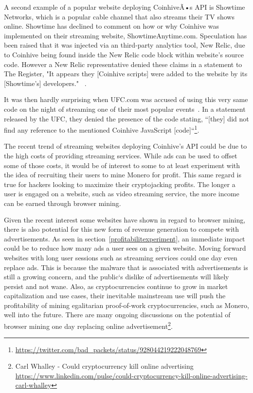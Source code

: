 A second example of a popular website deploying CoinhiveÃ•s API is Showtime Networks, which is a popular cable channel that also streams their TV shows online. Showtime has declined to comment on how or why Coinhive was implemented on their streaming website, ShowtimeAnytime.com. Speculation has been raised that it was injected via an third-party analytics tool, New Relic, due to Coinhive being found inside the New Relic code block within website's source code. However a New Relic representative denied these claims in a statement to The Register, "It appears they [Coinhive scripts] were added to the website by its [Showtime's] developers." ~\cite{registershowtime}. 

It was then hardly surprising when UFC.com was accused of using this very same code on the night of streaming one of their most popular events~\cite{registerufcmonero}. In a statement released by the UFC, they denied the presence of the code stating, ``[they] did not find any reference to the mentioned Coinhive JavaScript [code]``\footnote{\url{https://twitter.com/bad_packets/status/928044219222048769}}.
 
The recent trend of streaming websites deploying Coinhive's API could be due to the high costs of providing streaming services. While ads can be used to offset some of those costs, it would be of interest to some to at least experiment with the idea of recruiting their users to mine Monero for profit. This same regard is true for hackers looking to maximize their cryptojacking profits. The longer a user is engaged on a website, such as video streaming service, the more income can be earned through browser mining.


Given the recent interest some websites have shown in regard to browser mining, there is also potential for this new form of revenue generation to compete with advertisements. As seen in section~\ref{profitabilitexperiment}, an immediate impact could be to reduce how many ads a user sees on a given website. Moving forward websites with long user sessions such as streaming services could one day even replace ads. This is because the malware that is associated with advertisements is still a growing concern, and the public`s dislike of advertisements will likely persist and not wane. Also, as cryptocurrencies continue to grow in market capitalization and use cases, their inevitable mainstream use will push the profitability of mining egalitarian proof-of-work cryptocurrencies, such as Monero, well into the future. There are many ongoing discussions on the potential of browser mining one day replacing online advertisement\footnote{Carl Whalley - Could cryptocurrency kill online advertising \url{https://www.linkedin.com/pulse/could-cryptocurrency-kill-online-advertising-carl-whalley}}.


